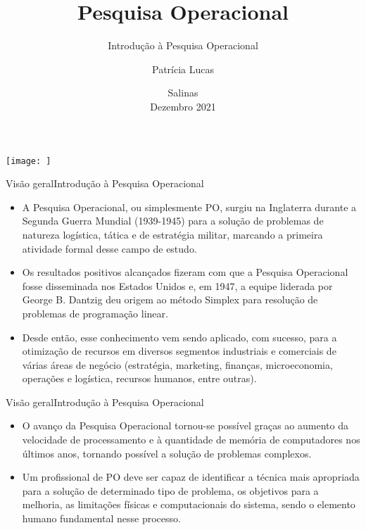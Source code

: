 \documentclass[t]{beamer}
\title[]{Pesquisa Operacional}
\subtitle[]{Introdução à Pesquisa Operacional}
\author[]{Patrícia Lucas\\{\footnotesize }}
\institute{Bacharelado em Sistemas de Informação \\ IFNMG  - Campus Salinas}
\date{\scriptsize Salinas\\Dezembro 2021}
\begin{document}
\begin{frame}

\begin{center}
\texttt{[image: ]}
\end{center}
  \titlepage
\end{frame}



\begin{ftst}{Visão geral}{Introdução à Pesquisa Operacional}
\small
\begin{itemize}
    \item A Pesquisa Operacional, ou simplesmente PO, surgiu na Inglaterra durante a Segunda Guerra Mundial (1939-1945) para a solução de problemas de natureza logística, tática e de estratégia militar, marcando a primeira atividade formal desse campo de estudo. 
    \vone
    \item Os resultados positivos alcançados fizeram com que a Pesquisa Operacional fosse disseminada nos Estados Unidos e, em 1947, a equipe liderada por George B. Dantzig deu origem ao método Simplex para resolução de problemas de programação linear.
    \vone
    \item Desde então, esse conhecimento vem sendo aplicado, com sucesso, para a otimização de recursos em diversos segmentos industriais e comerciais de várias áreas de negócio (estratégia, marketing, finanças, microeconomia, operações e logística, recursos humanos, entre outras).
\end{itemize}

\end{ftst}


\begin{ftst}{Visão geral}{Introdução à Pesquisa Operacional}
\begin{itemize}
    \item O avanço da Pesquisa Operacional tornou-se possível graças ao aumento da velocidade de processamento e à quantidade de memória de computadores nos últimos anos, tornando possível a solução de problemas complexos. 
    \vone
    \item Um profissional de PO deve ser capaz de identificar a técnica mais apropriada para a solução de determinado tipo de problema, os objetivos para a melhoria, as limitações físicas e computacionais do sistema, sendo o elemento humano fundamental nesse processo.
\end{itemize}

\end{ftst}
\end{document}
